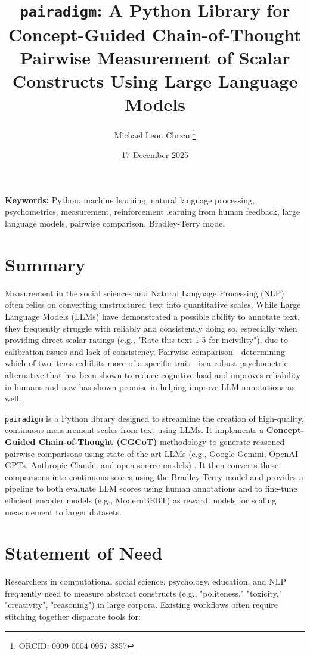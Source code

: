 \documentclass[11pt]{article}
\title{\texttt{pairadigm}: A Python Library for Concept-Guided Chain-of-Thought Pairwise Measurement of Scalar Constructs Using Large Language Models}
\author{Michael Leon Chrzan\thanks{ORCID: 0009-0004-0957-3857}}
\affil{Center for Educational Data Science and Innovation\\ University of Maryland, College Park MD USA}
\date{17 December 2025}
\begin{document}
\maketitle

\noindent\textbf{Keywords:} Python, machine learning, natural language processing, psychometrics, measurement, reinforcement learning from human feedback, large language models, pairwise comparison, Bradley-Terry model

\section{Summary}

Measurement in the social sciences and Natural Language Processing (NLP) often relies on converting unstructured text into quantitative scales. While Large Language Models (LLMs) have demonstrated a possible ability to annotate text, they frequently struggle with reliably and consistently doing so, especially when providing direct scalar ratings (e.g., "Rate this text 1-5 for incivility"), due to calibration issues and lack of consistency. Pairwise comparison—determining which of two items exhibits more of a specific trait—is a robust psychometric alternative that has been shown to reduce cognitive load and improves reliability in humans \citep{thurstone:1927} and now has shown promise in helping improve LLM annotations as well.

\texttt{pairadigm} is a Python library designed to streamline the creation of high-quality, continuous measurement scales from text using LLMs. It implements a \textbf{Concept-Guided Chain-of-Thought (CGCoT)} methodology to generate reasoned pairwise comparisons using state-of-the-art LLMs (e.g., Google Gemini, OpenAI GPTs, Anthropic Claude, and open source models) \citep{wu:2024}. It then converts these comparisons into continuous scores using the Bradley-Terry model \citep{bradley:1952} and provides a pipeline to both evaluate LLM scores using human annotations and to fine-tune efficient encoder models (e.g., ModernBERT) as reward models for scaling measurement to larger datasets.

\section{Statement of Need}

Researchers in computational social science, psychology, education, and NLP frequently need to measure abstract constructs (e.g., "politeness," "toxicity," "creativity", "reasoning") in large corpora. Existing workflows often require stitching together disparate tools for:
\end{document}
